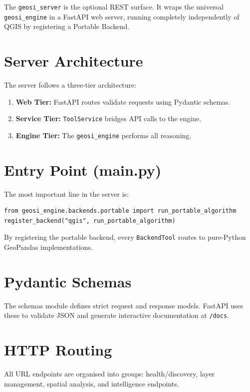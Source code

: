 \documentclass[12pt,a4paper]{report}
\begin{document}
The \texttt{geosi\_server} is the optional REST surface. It wraps the universal \texttt{geosi\_engine} in a FastAPI web server, running completely independently of QGIS by registering a Portable Backend.

\section{Server Architecture}

The server follows a three-tier architecture:

\begin{enumerate}
  \item \textbf{Web Tier:} FastAPI routes validate requests using Pydantic schemas.
  \item \textbf{Service Tier:} \texttt{ToolService} bridges API calls to the engine.
  \item \textbf{Engine Tier:} The \texttt{geosi\_engine} performs all reasoning.
\end{enumerate}

\section{Entry Point (main.py)}

The most important line in the server is:

\begin{lstlisting}
from geosi_engine.backends.portable import run_portable_algorithm
register_backend("qgis", run_portable_algorithm)
\end{lstlisting}

By registering the portable backend, every \texttt{BackendTool} routes to pure-Python GeoPandas implementations.

\section{Pydantic Schemas}

The schemas module defines strict request and response models. FastAPI uses these to validate JSON and generate interactive documentation at \texttt{/docs}.

\section{HTTP Routing}

All URL endpoints are organised into groups: health/discovery, layer management, spatial analysis, and intelligence endpoints.
\end{document}
